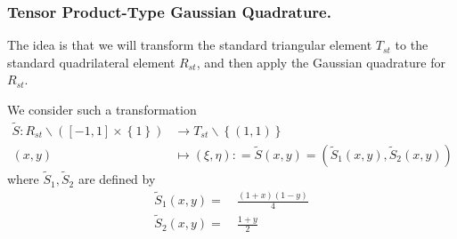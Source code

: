 \documentclass[a4paper]{article}
\numberwithin{equation}{section}
\begin{document}
\subsubsection{Tensor Product-Type Gaussian Quadrature.}
The idea is that we will transform the standard triangular element $T_{st}$ to the standard quadrilateral element $R_{st}$, and then apply the Gaussian quadrature for $R_{st}$. 

We consider such a transformation
\begin{align}
\widetilde S:{R_{st}}\backslash \left( {\left[ { - 1,1} \right] \times \left\{ 1 \right\}} \right) &\to {T_{st}}\backslash \left\{ {\left( {1,1} \right)} \right\}\\
\left( {x,y} \right) &\mapsto \left( {\xi ,\eta } \right): = \widetilde S\left( {x,y} \right) = \left( {{{\widetilde S}_1}\left( {x,y} \right),{{\widetilde S}_2}\left( {x,y} \right)} \right)
\end{align}
where $\widetilde{S}_1,\widetilde{S}_2$ are defined by
\begin{align}
{\widetilde S_1}\left( {x,y} \right) =&\ \frac{{\left( {1 + x} \right)\left( {1 - y} \right)}}{4}\\
{\widetilde S_2}\left( {x,y} \right) =&\ \frac{{1 + y}}{2}
\end{align}
\end{document}
